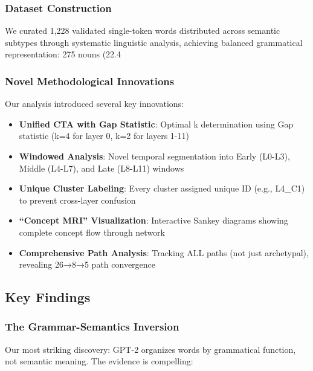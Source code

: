 \subsubsection{Dataset Construction}

We curated 1,228 validated single-token words distributed across semantic subtypes through systematic linguistic analysis, achieving balanced grammatical representation: 275 nouns (22.4%

\subsubsection{Novel Methodological Innovations}

Our analysis introduced several key innovations:

\begin{itemize}
    \item \textbf{Unified CTA with Gap Statistic}: Optimal k determination using Gap statistic (k=4 for layer 0, k=2 for layers 1-11)
    \item \textbf{Windowed Analysis}: Novel temporal segmentation into Early (L0-L3), Middle (L4-L7), and Late (L8-L11) windows
    \item \textbf{Unique Cluster Labeling}: Every cluster assigned unique ID (e.g., L4\_C1) to prevent cross-layer confusion
    \item \textbf{``Concept MRI'' Visualization}: Interactive Sankey diagrams showing complete concept flow through network
    \item \textbf{Comprehensive Path Analysis}: Tracking ALL paths (not just archetypal), revealing 26→8→5 path convergence
\end{itemize}

\subsection{Key Findings}

\subsubsection{The Grammar-Semantics Inversion}

Our most striking discovery: GPT-2 organizes words by grammatical function, not semantic meaning. The evidence is compelling:

